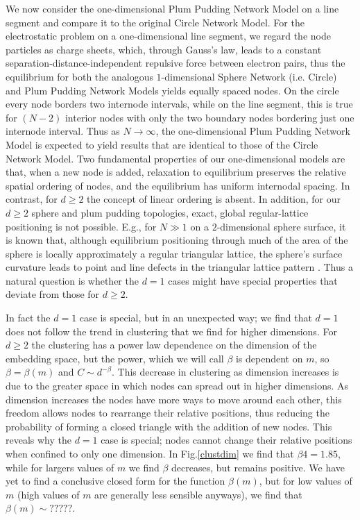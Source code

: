 \documentclass[aps,pre,manuscript,superscriptaddress,amsmath,amssymb,nofootinbib]{revtex4-1}
\begin{document}
We now consider the one-dimensional Plum Pudding Network Model on a line segment and compare it to the original Circle Network Model.
For the electrostatic problem on a one-dimensional line segment, we regard the node particles as charge sheets, which, through Gauss's law, leads to a constant separation-distance-independent repulsive force between electron pairs, thus the equilibrium for both the analogous $1$-dimensional Sphere Network (i.e. Circle) and Plum Pudding Network Models yields equally spaced nodes. 
On the circle every node borders two internode intervals, while on the line segment, this is true for $(N-2)$ interior nodes with only the two boundary nodes bordering just one internode interval.
Thus as $N \to \infty$, the one-dimensional Plum Pudding Network Model is expected to yield results that are identical to those of the Circle Network Model.
Two fundamental properties of our one-dimensional models are that, when a new node is added, relaxation to equilibrium preserves the relative spatial ordering of nodes, and the equilibrium has uniform internodal spacing.
In contrast, for $d \geq 2$ the concept of linear ordering is absent.
In addition, for our $d \geq 2$ sphere and plum pudding topologies, exact, global regular-lattice positioning is not possible.
E.g., for $N \gg 1$ on a $2$-dimensional sphere surface, it is known that, although equilibrium positioning through much of the area of the sphere is locally approximately a regular triangular lattice, the sphere's surface curvature leads to point and line defects in the triangular lattice pattern \cite{nelson}.
Thus a natural question is whether the $d = 1$ cases might have special properties that deviate from those for $d \geq 2$.

In fact the $d = 1$ case is special, but in an unexpected way; we find that $d = 1$ does not follow the trend in clustering that we find for higher dimensions. 
For $d \geq 2$ the clustering has a power law dependence on the dimension of the embedding space, but the power, which we will call $\beta$ is dependent on $m$, so $\beta = \beta(m)$ and $C \sim d^{-\beta}$.
This decrease in clustering as dimension increases is due to the greater space in which nodes can spread out in higher dimensions.
As dimension increases the nodes have more ways to move around each other, this freedom allows nodes to rearrange their relative positions, thus reducing the probability of forming a closed triangle with the addition of new nodes.
This reveals why the $d = 1$ case is special; nodes cannot change their relative positions when confined to only one dimension.
In Fig.\ref{clustdim} we find that $\beta{4} = 1.85$, while for largers values of $m$ we find $\beta$ decreases, but remains positive.
We have yet to find a conclusive closed form for the function $\beta(m)$, but for low values of $m$ (high values of $m$ are generally less sensible anyways), we find that $\beta(m) \sim ?????$.
\end{document}
